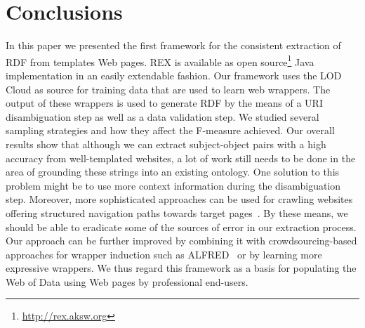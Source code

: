 \documentclass{llncs}
\begin{document}
\section{Conclusions}
\label{sec:conclusions}
In this paper we presented the first framework for the consistent extraction of RDF from templates Web pages. 
REX is available as open source\footnote{\url{http://rex.aksw.org}} Java implementation in an easily extendable fashion.
Our framework uses the LOD Cloud as source for training data that are used to learn web wrappers. 
The output of these wrappers is used to generate RDF by the means of a URI disambiguation step as well as a data validation step.
We studied several sampling strategies and how they affect the F-measure achieved.
Our overall results show that although we can extract subject-object pairs with a high accuracy from well-templated websites, a lot of work still needs to be done in the area of grounding these strings into an existing ontology.
One solution to this problem might be to use more context information during the disambiguation step.
Moreover, more sophisticated approaches can be used for crawling websites offering structured navigation paths towards target pages~\cite{DBLP:conf/webist/BlancoCM05}. 
By these means, we should be able to eradicate some of the sources of error in our extraction process. 
Our approach can be further improved by combining it with crowdsourcing-based approaches for wrapper induction such as ALFRED~\cite{Crescenzi2013} or by learning more expressive wrappers.
We thus regard this framework as a basis for populating the Web of Data using Web pages by professional end-users.
\end{document}
